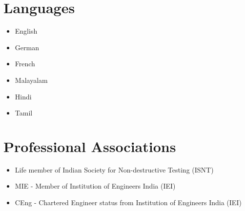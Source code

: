 \documentclass{my_cv}%
\begin{document}
\section{Languages}
\vspace{1em}
\noindent
\begin{minipage}{0.4\textwidth}
\begin{itemize}
\setlength\itemsep{0.0em}
\item[] English  \hspace{0.5em}  
\item[] German  \hspace{0.2em}  
\item[] French  \hspace{0.8em} 
\end{itemize}
\end{minipage}
\begin{minipage}{0.4\textwidth}
\begin{itemize}
\setlength\itemsep{0.0em}
\item[] Malayalam  \hspace{0.5em}  
\item[] Hindi      \hspace{2.9em}  
\item[] Tamil      \hspace{2.9em} 
\end{itemize}
\end{minipage}
\vspace{2em}

\section{Professional Associations}
\vspace{1em}
\begin{itemize}[leftmargin=0.15in]
\setlength\itemsep{-0.1em}
\color{mygray}
\item Life member of Indian Society for Non-destructive Testing (ISNT)
\item MIE - Member of Institution of Engineers India (IEI)
\item CEng - Chartered Engineer status from Institution of Engineers India (IEI) 
\end{itemize}
\end{document}
